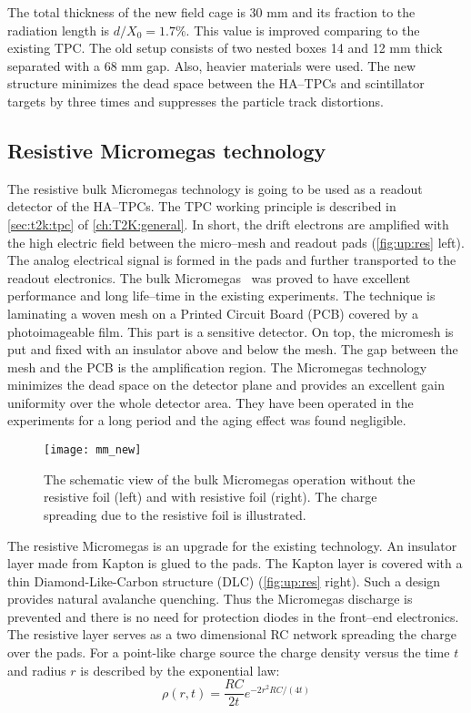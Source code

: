 \documentclass[../main.tex]{subfiles}
\begin{document}
The total thickness of the new field cage is 30 mm and its fraction to the radiation length is $d/X_0=1.7\%$. This value is improved comparing to the existing TPC. The old setup consists of two nested boxes 14 and 12 mm thick separated with a 68 mm gap. Also, heavier materials were used. The new structure minimizes the dead space between the HA--TPCs and scintillator targets by three times and suppresses the particle track distortions.

\subsection{Resistive Micromegas technology}
\label{sec:up:res}
The resistive bulk Micromegas technology is going to be used as a readout detector of the HA--TPCs. The TPC working principle is described in \autoref{sec:t2k:tpc} of \autoref{ch:T2K:general}. In short, the drift electrons are amplified with the high electric field between the micro--mesh and readout pads (\autoref{fig:up:res} left). The analog electrical signal is formed in the pads and further transported to the readout electronics. The bulk Micromegas~\cite{Giomataris2005} was proved to have excellent performance and long life--time in the existing experiments. The technique is laminating a woven mesh on a Printed Circuit Board (PCB) covered by a photoimageable film. This part is a sensitive detector. On top, the micromesh is put and fixed with an insulator above and below the mesh. The gap between the mesh and the PCB is the amplification region. The Micromegas technology minimizes the dead space on the detector plane and provides an excellent gain uniformity over the whole detector area. They have been operated in the experiments for a long period and the aging effect was found negligible.

\begin{figure}[!ht]
  \centering
  \texttt{[image: mm\_new]}
  \caption{The schematic view of the bulk Micromegas operation without the resistive foil (left) and with resistive foil (right). The charge spreading due to the resistive foil is illustrated.}
  \label{fig:up:res}
\end{figure}

The resistive Micromegas is an upgrade for the existing technology. An insulator layer made from Kapton is glued to the pads. The Kapton layer is covered with a thin Diamond-Like-Carbon structure (DLC) (\autoref{fig:up:res} right). Such a design provides natural avalanche quenching. Thus the Micromegas discharge is prevented and there is no need for protection diodes in the front--end electronics. The resistive layer serves as a two dimensional RC network spreading the charge over the pads. For a point-like charge source the charge density versus the time $t$ and radius $r$ is described by the exponential law:
\begin{equation}
\rho(r,t)=\frac{RC}{2t}e^{-2r^2RC/\left(4t\right)}
\end{equation}
\end{document}

